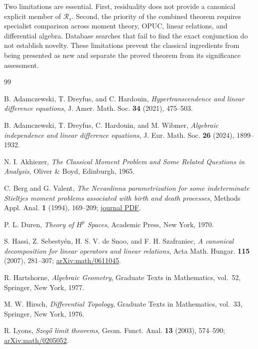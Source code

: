 \documentclass[11pt]{article}
\newcommand{\cR}{\mathcal R}
\begin{document}
Two limitations are essential.  First, residuality does not provide a canonical explicit member
of $\cR_s$.  Second, the priority of the combined theorem requires specialist comparison across
moment theory, OPUC, linear relations, and differential algebra.  Database searches that fail to
find the exact conjunction do not establish novelty.  These limitations prevent the classical
ingredients from being presented as new and separate the proved theorem from its significance
assessment.

\begin{thebibliography}{99}
\sloppy

B. Adamczewski, T. Dreyfus, and C. Hardouin,
\emph{Hypertranscendence and linear difference equations},
J. Amer. Math. Soc. \textbf{34} (2021), 475--503.

B. Adamczewski, T. Dreyfus, C. Hardouin, and M. Wibmer,
\emph{Algebraic independence and linear difference equations},
J. Eur. Math. Soc. \textbf{26} (2024), 1899--1932.

N. I. Akhiezer,
\emph{The Classical Moment Problem and Some Related Questions in Analysis},
Oliver \& Boyd, Edinburgh, 1965.

C. Berg and G. Valent,
\emph{The Nevanlinna parametrization for some indeterminate Stieltjes moment problems
associated with birth and death processes},
Methods Appl. Anal. \textbf{1} (1994), 169--209;
\href{https://www.intlpress.com/site/pub/files/_fulltext/journals/maa/1994/0001/0002/MAA-1994-0001-0002-a003.pdf}{journal PDF}.

P. L. Duren,
\emph{Theory of $H^p$ Spaces},
Academic Press, New York, 1970.

S. Hassi, Z. Sebesty\'en, H. S. V. de Snoo, and F. H. Szafraniec,
\emph{A canonical decomposition for linear operators and linear relations},
Acta Math. Hungar. \textbf{115} (2007), 281--307;
\href{https://arxiv.org/abs/math/0611045}{arXiv:math/0611045}.

R. Hartshorne,
\emph{Algebraic Geometry},
Graduate Texts in Mathematics, vol.~52, Springer, New York, 1977.

M. W. Hirsch,
\emph{Differential Topology},
Graduate Texts in Mathematics, vol.~33, Springer, New York, 1976.

R. Lyons,
\emph{Szeg\H{o} limit theorems},
Geom. Funct. Anal. \textbf{13} (2003), 574--590;
\href{https://arxiv.org/abs/math/0205052}{arXiv:math/0205052}.


\end{thebibliography}
\end{document}
